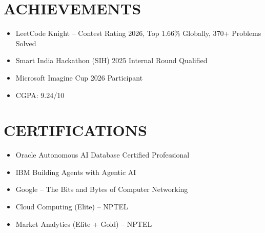 \documentclass[a4paper,10pt]{article}
\begin{document}

\section*{ACHIEVEMENTS}

\begin{itemize}

\item LeetCode Knight -- Contest Rating 2026, Top 1.66\% Globally, 370+ Problems Solved

\item Smart India Hackathon (SIH) 2025 Internal Round Qualified

\item Microsoft Imagine Cup 2026 Participant

\item CGPA: 9.24/10

\end{itemize}


\section*{CERTIFICATIONS}

\begin{itemize}

\item Oracle Autonomous AI Database Certified Professional

\item IBM Building Agents with Agentic AI

\item Google -- The Bits and Bytes of Computer Networking

\item Cloud Computing (Elite) -- NPTEL

\item Market Analytics (Elite + Gold) -- NPTEL


\end{itemize}
\end{document}
